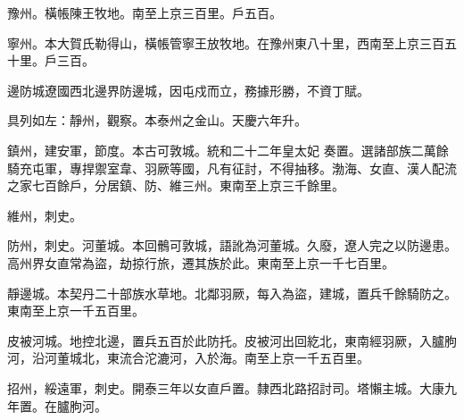 \begin{pinyinscope}
 豫州。橫帳陳王牧地。南至上京三百里。戶五百。



 寧州。本大賀氏勒得山，橫帳管寧王放牧地。在豫州東八十里，西南至上京三百五十里。戶三百。



 邊防城遼國西北邊界防邊城，因屯戍而立，務據形勝，不資丁賦。



 具列如左：靜州，觀察。本泰州之金山。天慶六年升。



 鎮州，建安軍，節度。本古可敦城。統和二十二年皇太妃
 奏置。選諸部族二萬餘騎充屯軍，專捍禦室韋、羽厥等國，凡有征討，不得抽移。渤海、女直、漢人配流之家七百餘戶，分居鎮、防、維三州。東南至上京三千餘里。



 維州，刺史。



 防州，刺史。河董城。本回鶻可敦城，語訛為河董城。久廢，遼人完之以防邊患。高州界女直常為盜，劫掠行旅，遷其族於此。東南至上京一千七百里。



 靜邊城。本契丹二十部族水草地。北鄰羽厥，每入為盜，建城，置兵千餘騎防之。東南至上京一千五百里。



 皮被河城。地控北邊，置兵五百於此防托。皮被河出回紇北，東南經羽厥，入臚朐河，沿河董城北，東流合沱漉河，入於海。南至上京一千五百里。



 招州，綏遠軍，刺史。開泰三年以女直戶置。隸西北路招討司。塔懶主城。大康九年置。在臚朐河。



\end{pinyinscope}